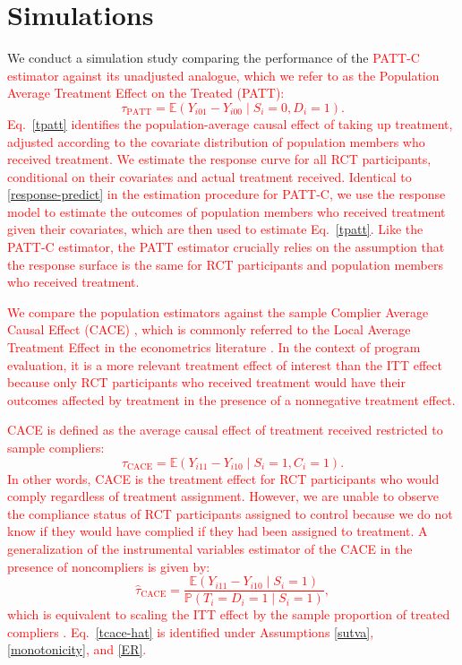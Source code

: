 \documentclass[hidelinks,12pt]{article}
\newcommand{\pr}{\mathbb{P}} %
\newcommand{\ex}{\mathbb{E}} %
\begin{document}
\section{Simulations} \label{sim}

We conduct a simulation study comparing the performance of the \textcolor{red}{PATT-C estimator against its unadjusted analogue, which we refer to as the Population Average Treatment Effect on the Treated (PATT):
%	
\begin{equation}\label{tpatt}
\tau_{\text{PATT}} = \ex\left( Y_{i01} - Y_{i00} \mid S_i=0, D_i=1\right).
\end{equation}
%
Eq.~\eqref{tpatt} identifies the population-average causal effect of taking up treatment, adjusted according to the covariate distribution of population members who received treatment. We estimate the response curve for all RCT participants, conditional on their covariates and actual treatment received. Identical to \ref{response-predict} in the estimation procedure for PATT-C, we use the response model to estimate the outcomes of population members who received treatment given their covariates, which are then used to estimate Eq.~\eqref{tpatt}. Like the PATT-C estimator, the PATT estimator crucially relies on the assumption that the response surface is the same for RCT participants and population members who received treatment.}

\textcolor{red}{
We compare the population estimators against the sample Complier Average Causal Effect (CACE) \citep{imbens1997bayesian}, which is commonly referred to the Local Average Treatment Effect in the econometrics literature \citep{imbens1994identification,Angrist1996}. In the context of program evaluation, it is a more relevant treatment effect of interest than the ITT effect because only RCT participants who received treatment would have their outcomes affected by treatment in the presence of a nonnegative treatment effect.} 

\textcolor{red}{
CACE is defined as the average causal effect of treatment received restricted to sample compliers:
%	
\begin{equation}\label{tcace}
\tau_{\text{CACE}} = \ex\left( Y_{i11} - Y_{i10} \mid S_i=1, C_i=1\right).
\end{equation}	
%
In other words, CACE is the treatment effect for RCT participants who would comply regardless of treatment assignment. However, we are unable to observe the compliance status of RCT participants assigned to control because we do not know if they would have complied if they had been assigned to treatment. A generalization of the instrumental variables estimator of the CACE in the presence of noncompliers is given by:
%	
\begin{equation}\label{tcace-hat}
\hat{\tau}_{\text{CACE}} = \frac{\ex\left( Y_{i11} - Y_{i10} \mid S_i=1\right)}{\pr(T_i = D_i = 1 \mid S_i=1)},
\end{equation}	
%
which is equivalent to scaling the ITT effect by the sample proportion of treated compliers \citep[e.g.,][]{freedman2006}. Eq.~\eqref{tcace-hat} is identified under Assumptions \eqref{sutva}, \eqref{monotonicity}, and \eqref{ER}.}
\end{document}
